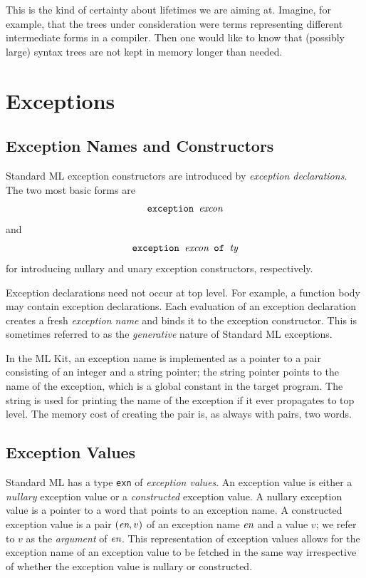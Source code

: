 \documentclass[12pt]{book}
\begin{document}
This is the kind of certainty about lifetimes we are aiming at.
Imagine, for example, that the trees under consideration were terms
representing different intermediate forms in a compiler. Then one
would like to know that (possibly large) syntax trees are not kept in
memory longer than needed.

\chapter{Exceptions}
\label{exceptions.sec}

\section{Exception Names and Constructors}
Standard ML
%
%
exception constructors are introduced by
%
% 
{\em exception declarations}. The two most basic forms are
$$\hbox{\tt exception {\it excon}}$$
and 
$$\hbox{\tt exception {\it excon} of {\it ty}}$$
for introducing nullary
and unary exception constructors, respectively.

Exception declarations need not occur at top level. For example, a
function body may contain exception declarations.  Each evaluation of
an exception declaration creates a fresh
%
%
{\em exception name\/} and binds it to the exception constructor. This
is sometimes referred to as the {\em generative\/} nature of Standard
ML exceptions.

In the ML Kit, an exception name is implemented as a pointer to a pair
consisting of an integer and a string pointer; the string pointer
points to the name of the exception, which is a global constant in the
target program. The string is used for printing the name of the
exception if it ever propagates to top level. The memory cost of
creating the pair is, as always with pairs, two words.

\section{Exception Values}
Standard ML has a type 
%
{\tt exn} of 
%
{\em exception values}.  An exception value is either a
%
{\em nullary\/} exception value or a 
%
{\em constructed\/} exception value. A nullary exception value is a
pointer to a word that points to an exception name. A constructed
exception value is a pair $(\hbox{\it en},v)$ of an exception name $\hbox{\it en}$
and a value $v$; we refer to $v$ as the {\em argument\/} of $\hbox{\it en}$.
This representation of exception values allows for the exception name
of an exception value to be fetched in the same way irrespective of
whether the exception value is nullary or constructed.
\end{document}

